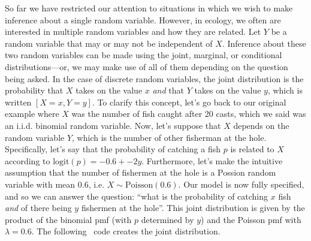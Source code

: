 So far we have restricted our attention to situations in which we wish
to make inference about a single random variable.
However, in ecology, we often are interested in multiple random
variables and how they are related.
Let $Y$ be a random variable
that may or may not be independent of $X$. Inference
about these two random variables can be made using the joint,
marginal, or conditional distributions---or, we may make use of all of
them depending on the question being asked. In the case of
discrete random variables, the joint
distribution is the probability that $X$ takes on the value $x$
\textit{and} that $Y$ takes on the value $y$, which is written
$[X=x,Y=y]$. To clarify this concept, let's go back to our original
example where $X$ was the number of fish caught after 20 casts, which
we said was an i.i.d.
binomial random variable. Now,
let's suppose that $X$ depends on the random variable $Y$, which is
the number of other fisherman at the hole. Specifically, let's say
that the probability of catching a fish $p$ is related to $X$
according to $\text{logit}(p) = -0.6 + -2y$. Furthermore, let's
make the intuitive assumption that the number of fishermen at the hole
is a Possion random variable with mean $0.6$, i.e. $X \sim
\text{Poisson}(0.6)$. Our model is now fully specified, and so we can
answer the question: ``what is the probability of catching $x$ fish
\textit{and} of there being $y$ fishermen at the hole''. This joint
distribution is given by the product of the binomial pmf (with $p$
determined by $y$) and the Poisson pmf with $\lambda=0.6$. The
following \R~code creates the joint distribution.
